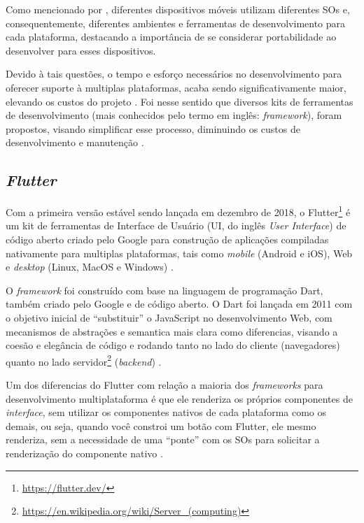 Como mencionado por , diferentes dispositivos móveis utilizam diferentes SOs e, consequentemente, diferentes
ambientes e ferramentas de desenvolvimento para cada plataforma, destacando a importância de se considerar portabilidade ao desenvolver para
esses dispositivos.

Devido à tais questões, o tempo e esforço necessários no desenvolvimento para oferecer suporte à multiplas plataformas, acaba sendo
significativamente maior, elevando os custos do projeto \cite{Henning2013,Wasserman2010}. Foi nesse sentido que diversos kits de ferramentas de
desenvolvimento (mais conhecidos pelo termo em inglês: \emph{framework}), foram propostos, visando simplificar esse processo, diminuindo os custos
de desenvolvimento e manutenção \cite{Martinez2017,Francese2015}.

\subsection{\emph{Flutter}}

Com a primeira versão estável sendo lançada em dezembro de 2018, o Flutter\footnote{\url{https://flutter.dev/}} é um kit de ferramentas de Interface
de Usuário (UI, do inglês \emph{User Interface}) de código aberto criado pelo Google para construção de aplicações compiladas nativamente
para multiplas plataformas, tais como \emph{mobile} (Android e iOS), Web e \emph{desktop} (Linux, MacOS e Windows) \cite{kuzmin2020experience}.

O \emph{framework} foi construído com base na linguagem de programação Dart, também criado pelo Google e de código aberto.
O Dart foi lançada em 2011 com o objetivo inicial de ``substituir'' o JavaScript no desenvolvimento Web,
com mecanismos de abstrações e semantica mais clara como diferencias, visando a coesão e elegância de código e
rodando tanto no lado do cliente (navegadores) quanto no lado servidor\footnote{\url{https://en.wikipedia.org/wiki/Server_(computing)}}
(\emph{backend}) \cite{walrath2012dart}.

Um dos diferencias do Flutter com relação a maioria dos \emph{frameworks} para desenvolvimento multiplataforma é que ele renderiza os próprios
componentes de \emph{interface}, sem utilizar os componentes nativos de cada plataforma como os demais, ou seja, quando você constroi um botão com Flutter,
ele mesmo renderiza, sem a necessidade de uma ``ponte'' com os SOs para solicitar a renderização do componente nativo \cite{zammetti2019practical,boukhary2019clean}.


